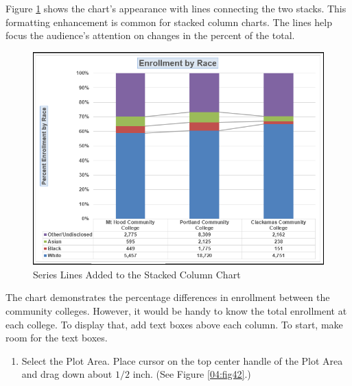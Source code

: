 Figure \ref{04:fig41} shows the chart's appearance with lines connecting the two stacks. This formatting enhancement is common for stacked column charts. The lines help focus the audience's attention on changes in the percent of the total.

\begin{figure}[H]
	\centering
	\includegraphics[width=\maxwidth{.95\linewidth}]{gfx/ch04_fig41}
	\caption{Series Lines Added to the Stacked Column Chart}
	\label{04:fig41}
\end{figure}

The chart demonstrates the percentage differences in enrollment between the community colleges. However, it would be handy to know the total enrollment at each college. To display that, add text boxes above each column. To start, make room for the text boxes.

\begin{enumbox}
	\begin{enumerate}
		\item Select the Plot Area. Place cursor on the top center handle of the Plot Area and drag down about $ 1/2 $ inch. (See Figure \ref{04:fig42}.)
	\end{enumerate}
\end{enumbox}
	
